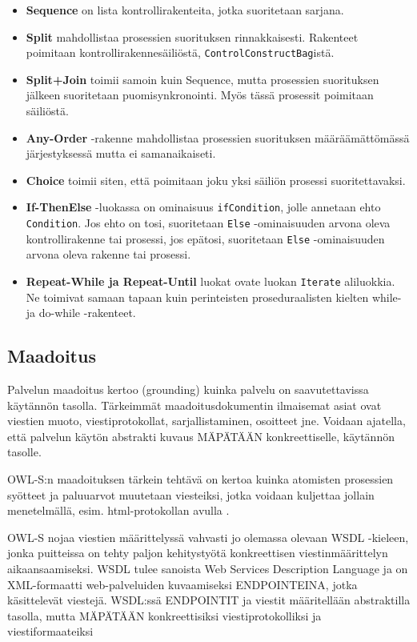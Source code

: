 \documentclass[finnish]{tktltiki2}
\theoremstyle{definition}
\theoremstyle{remark}
\begin{document}
 \begin{itemize}
\item \textbf{Sequence} on lista kontrollirakenteita, jotka suoritetaan sarjana. 
\item \textbf{Split} mahdollistaa prosessien suorituksen rinnakkaisesti. Rakenteet poimitaan kontrollirakennesäiliöstä, \texttt{ControlConstructBag}istä.
\item \textbf{Split+Join} toimii samoin kuin Sequence, mutta prosessien suorituksen jälkeen suoritetaan puomisynkronointi. Myös tässä prosessit poimitaan säiliöstä. 
\item \textbf{Any-Order} -rakenne mahdollistaa prosessien suorituksen määräämättömässä järjestyksessä mutta ei samanaikaiseti. 
\item \textbf{Choice} toimii siten, että poimitaan joku yksi säiliön prosessi suoritettavaksi.
\item \textbf{If-ThenElse} -luokassa on ominaisuus \texttt{ifCondition}, jolle annetaan ehto \texttt{Condition}. Jos ehto on tosi, suoritetaan \texttt{Else} -ominaisuuden arvona oleva kontrollirakenne tai prosessi, jos epätosi, suoritetaan \texttt{Else} -ominaisuuden arvona oleva rakenne tai prosessi. 
\item \textbf{Repeat-While ja Repeat-Until} luokat ovate luokan \texttt{Iterate} aliluokkia. Ne toimivat samaan tapaan kuin perinteisten proseduraalisten kielten while- ja do-while -rakenteet.   
\end{itemize}

\subsection{Maadoitus}

Palvelun maadoitus kertoo (grounding) kuinka palvelu on saavutettavissa käytännön tasolla. Tärkeimmät maadoitusdokumentin ilmaisemat asiat ovat viestien muoto, viestiprotokollat, sarjallistaminen, osoitteet jne\cite{OWLS}. Voidaan ajatella, että palvelun käytön abstrakti kuvaus MÄPÄTÄÄN  konkreettiselle, käytännön tasolle\cite{OWLS}. 

OWL-S:n maadoituksen tärkein tehtävä on kertoa kuinka atomisten prosessien syötteet ja paluuarvot muutetaan viesteiksi, jotka voidaan kuljettaa jollain menetelmällä, esim. html-protokollan avulla \cite{OWLS}. 

OWL-S nojaa viestien määrittelyssä vahvasti jo olemassa olevaan WSDL -kieleen, jonka puitteissa on tehty paljon kehitystyötä konkreettisen viestinmäärittelyn aikaansaamiseksi. WSDL tulee sanoista Web Services Description Language ja on XML-formaatti web-palveluiden kuvaamiseksi ENDPOINTEINA, jotka käsittelevät viestejä. WSDL:ssä ENDPOINTIT ja viestit määritellään abstraktilla tasolla, mutta MÄPÄTÄÄN konkreettisiksi viestiprotokolliksi ja viestiformaateiksi \cite{WSDL}    
\end{document}
